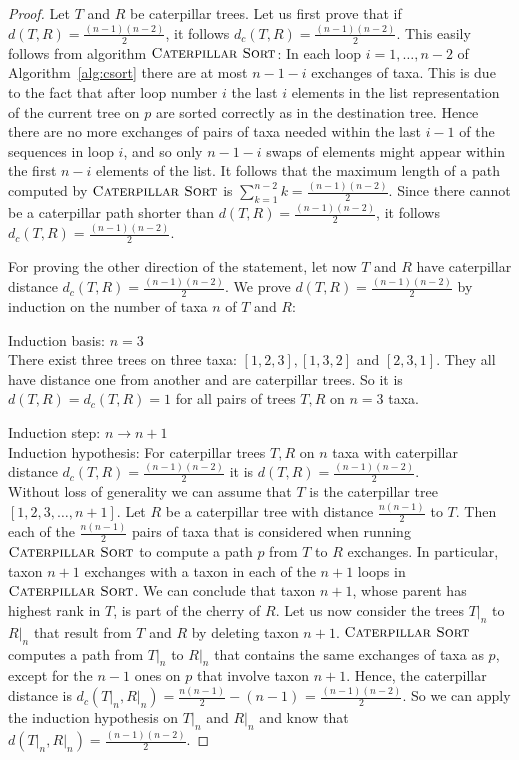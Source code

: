 \documentclass{amsart}
\newcommand{\csort}{\textsc{Caterpillar Sort}}
\begin{document}
\begin{proof}
    Let $T$ and $R$ be caterpillar trees.
    Let us first prove that if $d(T,R) = \frac{(n-1)(n-2)}{2}$, it follows $d_c(T,R) = \frac{(n-1)(n-2)}{2}$.
    This easily follows from algorithm $\csort$:
    In each loop $i=1, \ldots, n-2$ of Algorithm~\ref{alg:csort} there are at most $n-1-i$ exchanges of taxa.
    This is due to the fact that after loop number $i$ the last $i$ elements in the list representation of the current tree on $p$ are sorted correctly as in the destination tree.
    Hence there are no more exchanges of pairs of taxa needed within the last $i-1$ of the sequences in loop $i$, and so only $n-1-i$ swaps of elements might appear within the first $n-i$ elements of the list.
    It follows that the maximum length of a path computed by $\csort$ is $\sum\limits_{k=1}^{n-2} k = \frac{(n-1)(n-2)}{2}$.
    Since there cannot be a caterpillar path shorter than $d(T,R) = \frac{(n-1)(n-2)}{2}$, it follows $d_c(T,R) =  \frac{(n-1)(n-2)}{2}$.

    For proving the other direction of the statement, let now $T$ and $R$ have caterpillar distance $d_c(T,R) =  \frac{(n-1)(n-2)}{2}$.
    We prove $d(T,R) = \frac{(n-1)(n-2)}{2}$ by induction on the number of taxa $n$ of $T$ and $R$:

    Induction basis: $n=3$\\
    There exist three trees on three taxa: $[1,2,3], [1,3,2]$ and $[2,3,1]$.
    They all have distance one from another and are caterpillar trees.
    So it is $d(T,R) = d_c(T,R) = 1$ for all pairs of trees $T,R$ on $n=3$ taxa.

    Induction step: $n \to n+1$\\
    Induction hypothesis: For caterpillar trees $T, R$ on $n$ taxa with caterpillar distance $d_c(T,R) = \frac{(n-1)(n-2)}{2}$ it is $d(T,R) = \frac{(n-1)(n-2)}{2}$.\\
    Without loss of generality we can assume that $T$ is the caterpillar tree $[1,2,3,\ldots,n+1]$.
    Let $R$ be a caterpillar tree with distance $\frac{n(n-1)}{2}$ to $T$.
    Then each of the $\frac{n(n-1)}{2}$ pairs of taxa that is considered when running $\csort$ to compute a path $p$ from $T$ to $R$ exchanges.
    In particular, taxon $n+1$ exchanges with a taxon in each of the $n+1$ loops in $\csort$.
    We can conclude that taxon $n+1$, whose parent has highest rank in $T$, is part of the cherry of $R$.
    Let us now consider the trees $T{\big|}_n$ to $R{\big|}_n$ that result from $T$ and $R$ by deleting taxon $n+1$.
    $\csort$ computes a path from $T{\big|}_n$ to $R{\big|}_n$ that contains the same exchanges of taxa as $p$, except for the $n-1$ ones on $p$ that involve taxon $n+1$.
    Hence, the caterpillar distance is $d_c(T{\big|}_n, R{\big|}_n) = \frac{n(n-1)}{2} - (n-1)$ = $\frac{(n-1)(n-2)}{2}$.
    So we can apply the induction hypothesis on $T{\big|}_n$ and $R{\big|}_n$ and know that $d(T{\big|}_n,R{\big|}_n) = \frac{(n-1)(n-2)}{2}$.


\end{proof}
\end{document}
